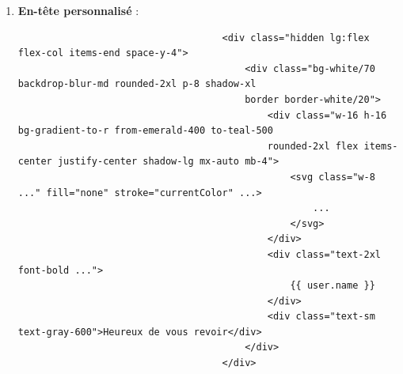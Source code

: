 \documentclass[a4paper,11pt]{article}
\begin{document}
                    \begin{enumerate}
                        \item \textbf{En-tête personnalisé} :
                            \begin{tcolorbox}[colback=lightgray!6, colframe=black, left=-70mm, right=5mm, top=2mm, bottom=0mm, boxrule=0.1mm]
                                \begin{verbatim}
                                    <div class="hidden lg:flex flex-col items-end space-y-4">
                                        <div class="bg-white/70 backdrop-blur-md rounded-2xl p-8 shadow-xl 
                                        border border-white/20">
                                            <div class="w-16 h-16 bg-gradient-to-r from-emerald-400 to-teal-500 
                                            rounded-2xl flex items-center justify-center shadow-lg mx-auto mb-4">
                                                <svg class="w-8 ..." fill="none" stroke="currentColor" ...>
                                                    ...
                                                </svg>
                                            </div>
                                            <div class="text-2xl font-bold ...">
                                                {{ user.name }}
                                            </div>
                                            <div class="text-sm text-gray-600">Heureux de vous revoir</div>
                                        </div>
                                    </div>
                                \end{verbatim}
                            \end{tcolorbox}


\end{enumerate}
\end{document}
